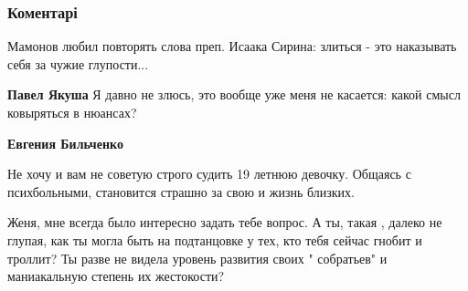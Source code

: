  
 
 
 
 
\subsubsection{Коментарі}
\label{sec:13_08_2021.fb.bilchenko_evgenia.1.maguchih.cmt}

\begin{itemize}
 
Мамонов любил повторять слова преп. Исаака Сирина: злиться - это наказывать себя за чужие глупости...

\begin{itemize}
 
\textbf{Павел Якуша} Я давно не злюсь, это вообще уже меня не касается: какой смысл ковыряться в нюансах?

 
\textbf{Евгения Бильченко}

Не хочу и вам не советую строго судить 19 летнюю девочку. Общаясь с
психбольными, становится страшно за свою и жизнь близких.

Женя, мне всегда было интересно задать тебе вопрос. А ты, такая , далеко не
глупая, как ты могла быть на подтанцовке у тех, кто тебя сейчас гнобит и
троллит? Ты разве не видела уровень развития своих " собратьев" и маниакальную
степень их жестокости?


 

\end{itemize}
\end{itemize}
